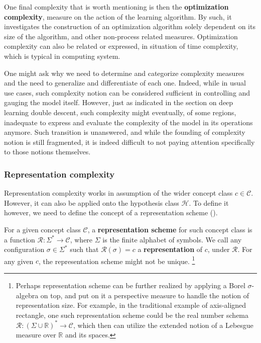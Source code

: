 \documentclass[10pt]{article} %
\begin{document}
One final complexity that is worth mentioning is then the \textbf{optimization complexity}, measure on the action of the learning algorithm. By such, it investigates the construction of an optimization algorithm solely dependent on its size of the algorithm, and other non-process related measures. Optimization complexity can also be related or expressed, in situation of time complexity, which is typical in computing system. 

One might ask why we need to determine and categorize complexity measures and the need to generalize and differentiate of each one. Indeed, while in usual use cases, such complexity notion can be considered sufficient in controlling and gauging the model itself. However, just as \cite{James2021} indicated in the section on deep learning double descent, such complexity might eventually, of some regions, inadequate to express and evaluate the complexity of the model in its operations anymore. Such transition is unanswered, and while the founding of complexity notion is still fragmented, it is indeed difficult to not paying attention specifically to those notions themselves. 

\subsubsection{Representation complexity}

Representation complexity works in assumption of the wider concept class $c\in \mathcal{C}$. However, it can also be applied onto the hypothesis class $\mathcal{H}$. To define it however, we need to define the concept of a representation scheme (\cite{10.5555/200548}). 

\begin{definition}
    For a given concept class $\mathcal{C}$, a \textbf{representation scheme} for such concept class is a function $\mathcal{R}: \Sigma^{*}\to \mathcal{C}$, where $\Sigma$ is the finite alphabet of symbols. We call any configuration $\sigma \in \Sigma^{*}$ such that $\mathcal{R}(\sigma)=c$ a \textbf{representation} of $c$, under $\mathcal{R}$. For any given $c$, the representation scheme might not be unique. \footnote{Perhaps representation scheme can be further realized by applying a Borel $\sigma$-algebra on top, and put on it a perspective measure to handle the notion of representation size. For example, in the traditional example of axis-aligned rectangle, one such representation scheme could be the real number schema $\mathcal{R}:(\Sigma \cup \mathbb{R})^{*}\to \mathcal{C}$, which then can utilize the extended notion of a Lebesgue measure over $\mathbb{R}$ and its spaces.}
\end{definition} 
\end{document}
